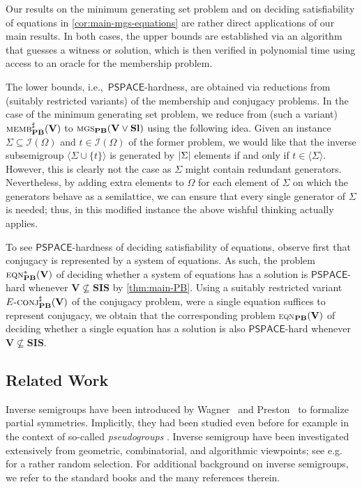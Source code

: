 \documentclass[anonymous,letter,UKenglish,cleveref,autoref,thm-restate]{lipics-v2021}
\newcommand{\ie}{i.e.,~}
\newcommand{\eg}{e.g.~}
\newcommand{\sse}{\subseteq}
\newcommand{\abs}[1] {\ensuremath\left|#1\right|}
\newcommand{\gen}[1]{\langle #1 \rangle}
\newcommand{\PSPACE}{\ensuremath{\mathsf{PSPACE}}\xspace}
\newcommand{\vV}{\ensuremath{\mathbf{V}}}
\newcommand{\vSl}{\ensuremath{\mathbf{Sl}}}
\newcommand{\vSI}{\ensuremath{\mathbf{SIS}}}
\newcommand{\ISym}{\cI}
\newcommand{\cI}{\mathcal{I}}
\theoremstyle{plain}
\theoremstyle{plain}
\newcommand{\dMembS}[2][]{\textup{\textsc{memb${}^{\sharp}_{\mathbf{#1}}\expandafter\ifx\expandafter\relax\detokenize{#2}\relax\else(#2)\fi$}}}
\newcommand{\dConjS}[2][]{\textup{\textsc{conj${}^{\sharp}_{\mathbf{#1}}\expandafter\ifx\expandafter\relax\detokenize{#2}\relax\else(#2)\fi$}}}
\newcommand{\dMGS}[2][]{\textup{\textsc{mgs${}_{\mathbf{#1}}\expandafter\ifx\expandafter\relax\detokenize{#2}\relax\else(#2)\fi$}}}
\newcommand{\dEqn}[2][]{\textup{\textsc{eqn${}_{\mathbf{#1}}\expandafter\ifx\expandafter\relax\detokenize{#2}\relax\else(#2)\fi$}}}
\newcommand{\dEqnSys}[2][]{\textup{\textsc{eqn${}^\ast_{\mathbf{#1}}\expandafter\ifx\expandafter\relax\detokenize{#2}\relax\else(#2)\fi$}}}
\newcommand{\dEConjS}[2][]{\ensuremath{E}\textnormal{-}\dConjS[#1]{#2}}
\begin{document}
Our results on the minimum generating set problem and on deciding satisfiability of equations in \cref{cor:main-mgs-equations} are rather direct applications of our main results. 
In both cases, the upper bounds are established via an algorithm that guesses a witness or solution, which is then verified in polynomial time using access to an oracle for the membership problem.

The lower bounds, \ie \PSPACE-hardness, are obtained via reductions from (suitably restricted variants) of the membership and conjugacy problems.
In the case of the minimum generating set problem, we reduce from (such a variant) $\dMembS[PB]{\vV}$ to $\dMGS[PB]{\vV \vee \vSl}$ using the following idea.
Given an instance $\Sigma \sse \ISym(\Omega)$ and $t\in \ISym(\Omega)$ of the former problem, we would like that the inverse subsemigroup $\gen{\Sigma \cup \{t\}}$ is generated by $\abs{\Sigma}$ elements if and only if $t \in \gen{\Sigma}$.
However, this is clearly not the case as $\Sigma$ might contain redundant generators.
Nevertheless, by adding extra elements to $\Omega$ for each element of $\Sigma$ on which the generators behave as a semilattice, we can ensure that every single generator of $\Sigma$ is needed; 
thus, in this modified instance the above wishful thinking actually applies.




To see \PSPACE-hardness of deciding satisfiability of equations, observe first that conjugacy is represented by a system of equations.
As such, the problem $\dEqnSys[PB]{\vV}$ of deciding whether a system of equations has a solution is \PSPACE-hard whenever $\vV \not\sse \vSI$ by \cref{thm:main-PB}.
Using a suitably restricted variant $\dEConjS[PB]{\vV}$ of the conjugacy problem, were a single equation suffices to represent conjugacy, we obtain that the corresponding problem \dEqn[PB]{\vV} of deciding whether a single equation has a solution is also \PSPACE-hard whenever $\vV \not\sse \vSI$.


\subsection{Related Work}\label{sec:related-work}

Inverse semigroups have been introduced by Wagner~\cite{Wagner52} and Preston~\cite{Preston54} to formalize partial symmetries. 
Implicitly, they had been studied even before for example in the context of so-called \emph{pseudogroups} \cite{Golab39}.
Inverse semigroup have been investigated extensively from geometric, combinatorial, and algorithmic viewpoints; see \eg \cite{ElliottLM24,Gray2020,Margolis-Meakin:1989,ms96,mun74,OlijnykSS10,Djadchenko77,Kleiman76,Kleiman79} for a rather random selection.
For additional background on inverse semigroups, we refer to the standard books \cite{Law99,Petrich84} and the many references therein.
\end{document}
